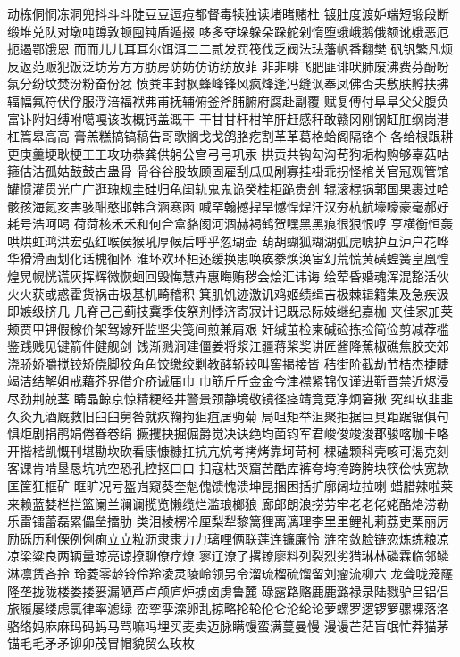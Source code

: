 动栋侗恫冻洞兜抖⽃斗陡⾖豆逗痘都督毒犊独读堵睹赌杜
镀肚度渡妒端短锻段断缎堆兑队对墩吨蹲敦顿囤钝盾遁掇
哆多夺垛躲朵跺舵剁惰堕蛾峨鹅俄额讹娥恶厄扼遏鄂饿恩
⽽而⼉儿⽿耳尔饵洱⼆二贰发罚筏伐乏阀法珐藩帆番翻樊
矾钒繁凡烦反返范贩犯饭泛坊芳⽅方肪房防妨仿访纺放菲
⾮非啡飞肥匪诽吠肺废沸费芬酚吩氛分纷坟焚汾粉奋份忿
愤粪丰封枫蜂峰锋风疯烽逢冯缝讽奉凤佛否夫敷肤孵扶拂
辐幅氟符伏俘服浮涪福袱弗甫抚辅俯釜斧脯腑府腐赴副覆
赋复傅付⾩阜⽗父腹负富讣附妇缚咐噶嘎该改概钙盖溉⼲
干⽢甘杆柑竿肝赶感秆敢赣冈刚钢缸肛纲岗港杠篙皋⾼高
膏羔糕搞镐稿告哥歌搁⼽戈鸽胳疙割⾰革葛格蛤阁隔铬个
各给根跟耕更庚羹埂耿梗⼯工攻功恭龚供躬公宫⼸弓巩汞
拱贡共钩勾沟苟狗垢构购够辜菇咕箍估沽孤姑⿎鼓古蛊⾻
骨⾕谷股故顾固雇刮⽠瓜剐寡挂褂乖拐怪棺关官冠观管馆
罐惯灌贯光⼴广逛瑰规圭硅归龟闺轨⿁鬼诡癸桂柜跪贵刽
辊滚棍锅郭国果裹过哈骸孩海氦亥害骇酣憨邯韩含涵寒函
喊罕翰撼捍旱憾悍焊汗汉夯杭航壕嚎豪毫郝好耗号浩呵喝
荷菏核⽲禾和何合盒貉阂河涸赫褐鹤贺嘿⿊黑痕很狠恨哼
亨横衡恒轰哄烘虹鸿洪宏弘红喉侯猴吼厚候后呼乎忽瑚壶
葫胡蝴狐糊湖弧虎唬护互沪户花哗华猾滑画划化话槐徊怀
淮坏欢环桓还缓换患唤痪豢焕涣宦幻荒慌黄磺蝗簧皇凰惶
煌晃幌恍谎灰挥辉徽恢蛔回毁悔慧卉惠晦贿秽会烩汇讳诲
绘荤昏婚魂浑混豁活伙⽕火获或惑霍货祸击圾基机畸稽积
箕肌饥迹激讥鸡姬绩缉吉极棘辑籍集及急疾汲即嫉级挤⼏
几脊⼰己蓟技冀季伎祭剂悸济寄寂计记既忌际妓继纪嘉枷
夹佳家加荚颊贾甲钾假稼价架驾嫁歼监坚尖笺间煎兼肩艰
奸缄茧检柬碱硷拣捡简俭剪减荐槛鉴践贱见键箭件健舰剑
饯渐溅涧建僵姜将浆江疆蒋桨奖讲匠酱降蕉椒礁焦胶交郊
浇骄娇嚼搅铰矫侥脚狡⾓角饺缴绞剿教酵轿较叫窖揭接皆
秸街阶截劫节桔杰捷睫竭洁结解姐戒藉芥界借介疥诫届⼱
巾筋⽄斤⾦金今津襟紧锦仅谨进靳晋禁近烬浸尽劲荆兢茎
睛晶鲸京惊精粳经井警景颈静境敬镜径痉靖竟竞净炯窘揪
究纠玖⾲韭久灸九酒厩救旧⾅臼舅咎就疚鞠拘狙疽居驹菊
局咀矩举沮聚拒据巨具距踞锯俱句惧炬剧捐鹃娟倦眷卷绢
撅攫抉掘倔爵觉决诀绝均菌钧军君峻俊竣浚郡骏喀咖卡咯
开揩楷凯慨刊堪勘坎砍看康慷糠扛抗亢炕考拷烤靠坷苛柯
棵磕颗科壳咳可渴克刻客课肯啃垦恳坑吭空恐孔控抠⼝口
扣寇枯哭窟苦酷库裤夸垮挎跨胯块筷侩快宽款匡筐狂框矿
眶旷况亏盔岿窥葵奎魁傀馈愧溃坤昆捆困括扩廓阔垃拉喇
蜡腊辣啦莱来赖蓝婪栏拦篮阑兰澜谰揽览懒缆烂滥琅榔狼
廊郎朗浪捞劳牢⽼老佬姥酪烙涝勒乐雷镭蕾磊累儡垒擂肋
类泪棱楞冷厘梨犁黎篱狸离漓理李⾥里鲤礼莉荔吏栗丽厉
励砾历利傈例俐痢⽴立粒沥⾪隶⼒力璃哩俩联莲连镰廉怜
涟帘敛脸链恋炼练粮凉凉梁粱良两辆量晾亮谅撩聊僚疗燎
寥辽潦了撂镣廖料列裂烈劣猎琳林磷霖临邻鳞淋凛赁吝拎
玲菱零龄铃伶羚凌灵陵岭领另令溜琉榴硫馏留刘瘤流柳六
龙聋咙笼窿隆垄拢陇楼娄搂篓漏陋芦卢颅庐炉掳卤虏鲁麓
碌露路赂⿅鹿潞禄录陆戮驴吕铝侣旅履屡缕虑氯律率滤绿
峦挛孪滦卵乱掠略抡轮伦仑沦纶论萝螺罗逻锣箩骡裸落洛
骆络妈⿇麻玛码蚂马骂嘛吗埋买麦卖迈脉瞒馒蛮满蔓曼慢
漫谩芒茫盲氓忙莽猫茅锚⽑毛⽭矛铆卯茂冒帽貌贸么玫枚
